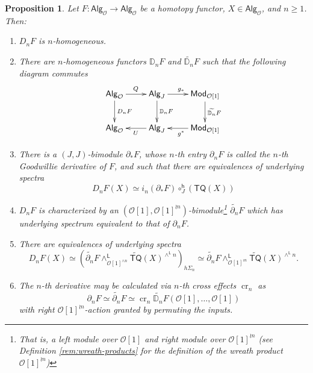 \documentclass[11pt]{amsart}
\newtheorem{proposition}[subsection]{Proposition}
\theoremstyle{definition}
\theoremstyle{remark}
\newcommand{\TQ}{\mathsf{TQ}}
\newcommand{\Alg}[1]{ {\mathsf{Alg}_{\mathcal{#1}}} }
\newcommand{\cro}{\operatorname{cr}}
\newcommand{\Cal}[1]{\mathcal{#1}}
\begin{document}
\begin{proposition}
\label{prop:functor-calc-recap}
Let $F\colon \Alg{O}\to \Alg{O}$ be a homotopy functor, $X\in \Alg{O}$, and $n\geq 1$. Then: \begin{enumerate}[label=(\roman*)]
    \item $D_nF$ is \textit{$n$-homogeneous}.

    \item There are $n$-homogeneous functors $\mathbb{D}_n F$ and $\widetilde{\mathbb{D}_n}F$ such that the following diagram commutes
    \begin{equation} \label{eq:fact}
    \xymatrix{
    \Alg{O} \ar[r]^{Q} \ar[d]^-{D_nF} &
    \mathsf{Alg}_{J} \ar[r]^{g_*} \ar[d]^-{\mathbb{D}_n F} &
    \mathsf{Mod}_{\Cal{O}[1]}  \ar[d]^-{\widetilde{\mathbb{D}_n}F} \\
    \Alg{O}  &
    \mathsf{Alg}_{J} \ar[l]^{U}  &
    \mathsf{Mod}_{\Cal{O}[1]} \ar[l]^{g^*}
    }  
\end{equation}

    \item There is a $(J,J)$-bimodule $\partial_*F$, whose $n$-th entry $\partial_n F$ is called the \textit{$n$-th Goodwillie derivative of $F$}, and such that there are equivalences of underlying spectra \begin{equation*}\label{homog-layer-2}
    D_n F(X) \simeq  i_n (\partial_* F) \circ^{\mathsf{h}}_J (\TQ(X)) \end{equation*} 
    
    \item $D_nF$ is characterized by an $(\Cal{O}[1],\Cal{O}[1]^{\wr n})$-bimodule\footnote{That is, a left module over $\Cal{O}[1]$ and right module over $\Cal{O}[1]^{\wr n}$
        (see Definition \ref{rem:wreath-products} for the definition of the wreath product $\Cal{O}[1]^{\wr n}$)
    } $\widetilde{\partial_n}F$ which has underlying spectrum equivalent to that of $\partial_nF$. 
    
    \item There are equivalences of underlying spectra \begin{equation}\label{homog-layer-1}
    D_n F(X) \simeq (\widetilde{\partial_n} F \wedge^{\mathsf{L}}_{\Cal{O}[1]^{\wedge n}} \widetilde{\TQ}(X)^{\wedge^{\mathsf{L}} n})_{h\Sigma_n}
    \simeq \widetilde{\partial_n} F\wedge^{\mathsf{L}}_{\Cal{O}[1]^{\wr n}} \widetilde{\TQ}(X)^{\wedge^{\mathsf{L}} n}. \end{equation}

    \item The $n$-th derivative may be calculated via $n$-th cross effects $\cro_n$ as \[\partial_n F \simeq \widetilde{\partial_n}F\simeq \cro_n \widetilde{\mathbb{D}_n} F (\Cal{O}[1],\dots, \Cal{O}[1])\] with right $\Cal{O}[1]^{\wr n}$-action granted by permuting the inputs.
\end{enumerate}
\end{proposition}
\end{document}
